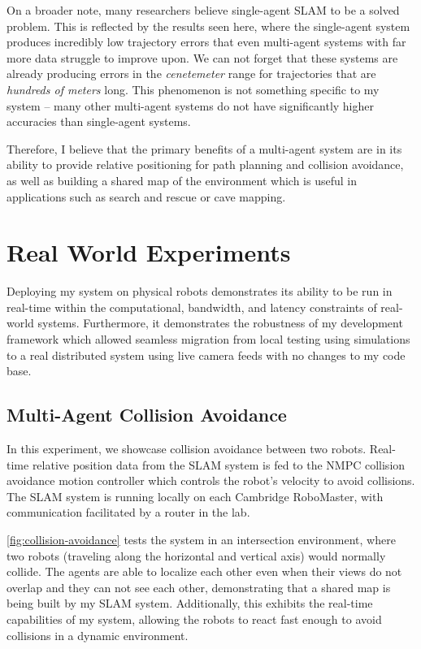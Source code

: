 On a broader note, many researchers believe single-agent SLAM to be a solved problem. This is reflected by the results seen here, where the single-agent system produces incredibly low trajectory errors that even multi-agent systems with far more data struggle to improve upon. We can not forget that these systems are already producing errors in the \textit{cenetemeter} range for trajectories that are \textit{hundreds of meters} long. This phenomenon is not something specific to my system – many other multi-agent systems do not have significantly higher accuracies than single-agent systems.

Therefore, I believe that the primary benefits of a multi-agent system are in its ability to provide relative positioning for path planning and collision avoidance, as well as building a shared map of the environment which is useful in applications such as search and rescue or cave mapping.


\section{Real World Experiments}
\label{sec:real-world-experiments}
Deploying my system on physical robots demonstrates its ability to be run in real-time within the computational, bandwidth, and latency constraints of real-world systems. Furthermore, it demonstrates the robustness of my development framework which allowed seamless migration from local testing using simulations to a real distributed system using live camera feeds with no changes to my code base.

\subsection{Multi-Agent Collision Avoidance}
\label{sec:multi-agent-collision-avoidance}
In this experiment, we showcase collision avoidance between two robots. Real-time relative position data from the SLAM system is fed to the NMPC collision avoidance motion controller which controls the robot's velocity to avoid collisions. The SLAM system is running locally on each Cambridge RoboMaster, with communication facilitated by a router in the lab.

\autoref{fig:collision-avoidance} tests the system in an intersection environment, where two robots (traveling along the horizontal and vertical axis) would normally collide. The agents are able to localize each other even when their views do not overlap and they can not see each other, demonstrating that a shared map is being built by my SLAM system. Additionally, this exhibits the real-time capabilities of my system, allowing the robots to react fast enough to avoid collisions in a dynamic environment.

